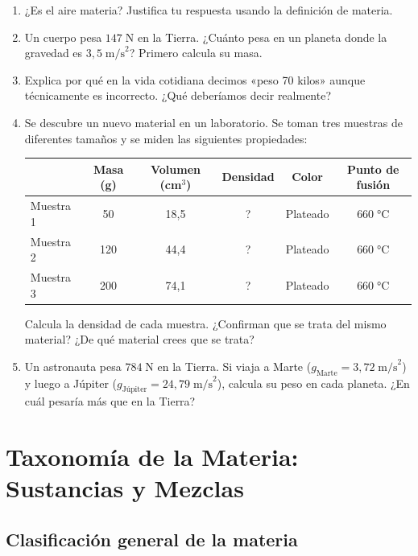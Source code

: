 \documentclass[12pt, a4paper]{article}
\begin{document}
\begin{enumerate}[leftmargin=*, resume]
  \item \medio{} ¿Es el aire materia? Justifica tu respuesta usando la definición de materia.

  \item \dificil{} Un cuerpo pesa $147\;\text{N}$ en la Tierra. ¿Cuánto pesa en un planeta donde la gravedad es $3{,}5\;\text{m/s}^2$? Primero calcula su masa.

  \item \dificil{} Explica por qué en la vida cotidiana decimos «peso 70 kilos» aunque técnicamente es incorrecto. ¿Qué deberíamos decir realmente?

  \item \dificil{} Se descubre un nuevo material en un laboratorio. Se toman tres muestras de diferentes tamaños y se miden las siguientes propiedades:
  \begin{center}
  \small
  \begin{tabular}{lccccc}
  \toprule
  & Masa (g) & Volumen (cm$^3$) & Densidad & Color & Punto de fusión \\
  \midrule
  Muestra 1 & 50 & 18{,}5 & ? & Plateado & $660\;°$C \\
  Muestra 2 & 120 & 44{,}4 & ? & Plateado & $660\;°$C \\
  Muestra 3 & 200 & 74{,}1 & ? & Plateado & $660\;°$C \\
  \bottomrule
  \end{tabular}
  \end{center}
  Calcula la densidad de cada muestra. ¿Confirman que se trata del mismo material? ¿De qué material crees que se trata?

  \item \dificil{} Un astronauta pesa $784\;\text{N}$ en la Tierra. Si viaja a Marte ($g_{\text{Marte}} = 3{,}72\;\text{m/s}^2$) y luego a Júpiter ($g_{\text{Júpiter}} = 24{,}79\;\text{m/s}^2$), calcula su peso en cada planeta. ¿En cuál pesaría más que en la Tierra?
\end{enumerate}


\section{Taxonomía de la Materia: Sustancias y Mezclas}

\subsection{Clasificación general de la materia}
\end{document}
